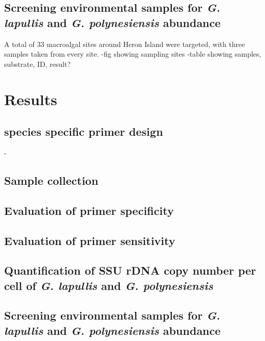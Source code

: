 \documentclass[12pt]{article}
\begin{document}


\subsection{Screening environmental samples for \emph{G. lapullis} and \emph{G. polynesiensis} abundance}
A total of 33 macroalgal sites around Heron Island were targeted, with three samples taken from every site. 
-fig showing sampling sites
-table showing samples, substrate, ID, result? 

\newpage
\section{Results}
\subsection{species specific primer design}
- 
\subsection{Sample collection}

\subsection{Evaluation of primer specificity}

\subsection{Evaluation of primer sensitivity}

\subsection{Quantification of SSU rDNA copy number per cell of \emph{G. lapullis} and \emph{G. polynesiensis}}

\subsection{Screening environmental samples for \emph{G. lapullis} and \emph{G. polynesiensis} abundance}
\end{document}
